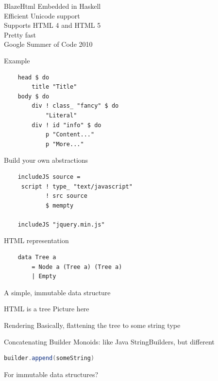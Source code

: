 \documentclass[20pt]{beamer}
\newcommand{\vspaced}{
    \vspace{5mm}
}
\begin{document}
\begin{frame}{BlazeHtml}
    Embedded in Haskell \\
    Efficient Unicode support \\
    Supports HTML 4 and HTML 5 \\
    Pretty fast \\
    Google Summer of Code 2010 \\
\end{frame}

\begin{frame}[fragile]{Example}
    \begin{lstlisting}
    head $ do
        title "Title"
    body $ do
        div ! class_ "fancy" $ do
            "Literal"
        div ! id "info" $ do
            p "Content..."
            p "More..."
    \end{lstlisting}
\end{frame}

\begin{frame}[fragile]{Build your own abstractions}
    \begin{lstlisting}
    includeJS source =
     script ! type_ "text/javascript"
            ! src source
            $ mempty

    includeJS "jquery.min.js"
    \end{lstlisting}
\end{frame}

\begin{frame}[fragile]{HTML representation}
    \begin{lstlisting}
    data Tree a
        = Node a (Tree a) (Tree a)
        | Empty
    \end{lstlisting}
    \vspaced
    A simple, immutable data structure
\end{frame}

\begin{frame}{HTML is a tree}
    Picture here
\end{frame}

\begin{frame}{Rendering}
    Basically, flattening the tree to some string type
\end{frame}

\begin{frame}[fragile]{Concatenating}
    Builder Monoids: like Java StringBuilders, but different
    \vspaced
    \begin{lstlisting}[language=Java]
    builder.append(someString)
    \end{lstlisting}
    \vspaced
    For immutable data structures?
\end{frame}
\end{document}
